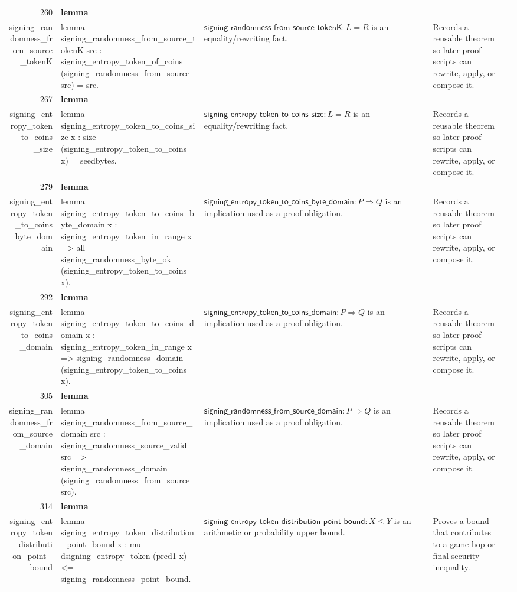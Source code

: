 \documentclass[10pt]{article}
\newcommand{\ec}[1]{\begingroup\ttfamily\scriptsize #1\endgroup}
\begin{document}
\begin{longtable}{r L{0.17\textwidth} L{0.26\textwidth} L{0.27\textwidth} L{0.20\textwidth}}
260 & \textbf{lemma}\\\ec{signing\_randomness\_from\_source\_tokenK} & \ec{lemma signing\_randomness\_from\_source\_tokenK src : signing\_entropy\_token\_of\_coins (signing\_randomness\_from\_source src) = src.} & \(\mathsf{signing\_randomness\_from\_source\_tokenK} : L = R\) is an equality/rewriting fact. & Records a reusable theorem so later proof scripts can rewrite, apply, or compose it. \\
267 & \textbf{lemma}\\\ec{signing\_entropy\_token\_to\_coins\_size} & \ec{lemma signing\_entropy\_token\_to\_coins\_size x : size (signing\_entropy\_token\_to\_coins x) = seedbytes.} & \(\mathsf{signing\_entropy\_token\_to\_coins\_size} : L = R\) is an equality/rewriting fact. & Records a reusable theorem so later proof scripts can rewrite, apply, or compose it. \\
279 & \textbf{lemma}\\\ec{signing\_entropy\_token\_to\_coins\_byte\_domain} & \ec{lemma signing\_entropy\_token\_to\_coins\_byte\_domain x : signing\_entropy\_token\_in\_range x => all signing\_randomness\_byte\_ok (signing\_entropy\_token\_to\_coins x).} & \(\mathsf{signing\_entropy\_token\_to\_coins\_byte\_domain} : P \Rightarrow Q\) is an implication used as a proof obligation. & Records a reusable theorem so later proof scripts can rewrite, apply, or compose it. \\
292 & \textbf{lemma}\\\ec{signing\_entropy\_token\_to\_coins\_domain} & \ec{lemma signing\_entropy\_token\_to\_coins\_domain x : signing\_entropy\_token\_in\_range x => signing\_randomness\_domain (signing\_entropy\_token\_to\_coins x).} & \(\mathsf{signing\_entropy\_token\_to\_coins\_domain} : P \Rightarrow Q\) is an implication used as a proof obligation. & Records a reusable theorem so later proof scripts can rewrite, apply, or compose it. \\
305 & \textbf{lemma}\\\ec{signing\_randomness\_from\_source\_domain} & \ec{lemma signing\_randomness\_from\_source\_domain src : signing\_randomness\_source\_valid src => signing\_randomness\_domain (signing\_randomness\_from\_source src).} & \(\mathsf{signing\_randomness\_from\_source\_domain} : P \Rightarrow Q\) is an implication used as a proof obligation. & Records a reusable theorem so later proof scripts can rewrite, apply, or compose it. \\
314 & \textbf{lemma}\\\ec{signing\_entropy\_token\_distribution\_point\_bound} & \ec{lemma signing\_entropy\_token\_distribution\_point\_bound x : mu dsigning\_entropy\_token (pred1 x) <= signing\_randomness\_point\_bound.} & \(\mathsf{signing\_entropy\_token\_distribution\_point\_bound} : X \le Y\) is an arithmetic or probability upper bound. & Proves a bound that contributes to a game-hop or final security inequality. \\

\end{longtable}
\end{document}
